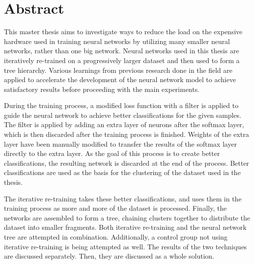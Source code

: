 \chapter*{Abstract}

This master thesis aims to investigate ways to reduce the load on the expensive hardware used in training neural networks by utilizing many smaller neural networks, rather than one big network.
Neural networks used in this thesis are iteratively re-trained on a progressively larger dataset and then used to form a tree hierarchy.
Various learnings from previous research done in the field are applied to accelerate the development of the neural network model to achieve satisfactory results before proceeding with the main experiments.

During the training process, a modified loss function with a filter is applied to guide the neural network to achieve better classifications for the given samples.
The filter is applied by adding an extra layer of neurons after the softmax layer, which is then discarded after the training process is finished.
Weights of the extra layer have been manually modified to transfer the results of the softmax layer directly to the extra layer.
As the goal of this process is to create better classifications, the resulting network is discarded at the end of the process.
Better classifications are used as the basis for the clustering of the dataset used in the thesis.

The iterative re-training takes these better classifications, and uses them in the training process as more and more of the dataset is processed.
Finally, the networks are assembled to form a tree, chaining clusters together to distribute the dataset into smaller fragments.
Both iterative re-training and the neural network tree are attempted in combination.
Additionally, a control group not using iterative re-training is being attempted as well.
The results of the two techniques are discussed separately.
Then, they are discussed as a whole solution.


